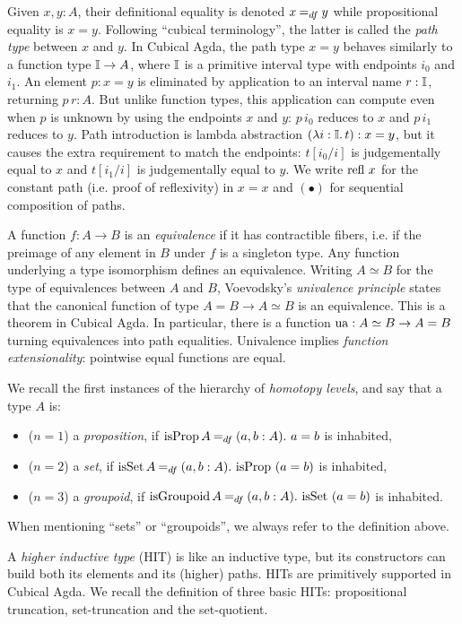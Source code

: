 \documentclass[a4paper,USenglish,cleveref]{lipics-v2021}
\begin{document}
Given $x, y : A$, their definitional equality is denoted $x \DefEq y$ while propositional equality is $x = y$.
Following ``cubical terminology'', the latter is called the \emph{path type} between $x$ and $y$.
In Cubical Agda, the path type $x = y$ behaves similarly to a function type $\mathbb{I} \to A$, where $\mathbb{I}$ is a primitive interval type with endpoints $i_0$ and $i_1$.
An element $p : x = y$ is eliminated by application to an interval name $r : \mathbb{I}$, returning $p \, r : A$.
But unlike function types, this application can compute even when $p$ is unknown by using the endpoints $x$ and $y$: $p \,i_0$ reduces to $x$ and $p \,i_1$ reduces to $y$.
Path introduction is lambda abstraction $(\lambda i : \mathbb{I}.\,t) : x = y$, but it causes the extra requirement to match the endpoints: $t[i_0 / i]$ is judgementally equal to $x$ and $t[i_1 / i]$ is judgementally equal to  $y$. We write $\Refl\,x$ for the constant path (i.e. proof of reflexivity) in $x = x$ and $(\bullet)$ for sequential composition of paths.

A function $f : A \to B$ is an \emph{equivalence} if it has contractible fibers, i.e. if the preimage of any element in $B$ under $f$ is a singleton type. Any function underlying a type isomorphism defines an equivalence. Writing $A \simeq B$ for the type of equivalences between $A$ and $B$, Voevodsky's \emph{univalence principle} states that the canonical function of type $A = B \to A \simeq B$ is an equivalence. This is a theorem in Cubical Agda. In particular, there is a function $\Op{ua} : A \simeq B \to A = B$ turning equivalences into path equalities. Univalence implies \emph{function extensionality}: pointwise equal functions are equal.

We recall the first instances of the hierarchy of \emph{homotopy levels}, and say that a type $A$ is:
\begin{itemize}
  \item[] ($n = 1$) a \emph{proposition}, if
    $\IsProp A \DefEq (a , b : A)\Where a = b$ is inhabited,
  \item[] ($n = 2$) a \emph{set}, if
    $\IsSet A \DefEq (a, b : A)\Where \IsProp \ (a = b)$ is inhabited,
  \item[] ($n = 3$) a \emph{groupoid}, if
    $\IsGpd A \DefEq (a, b : A)\Where \IsSet \ (a = b)$ is inhabited.
\end{itemize}
When mentioning \enquote{sets} or \enquote{groupoids}, we always refer to the definition above.

A \emph{higher inductive type} (HIT) is like an inductive type, but its constructors can build both its elements and its (higher) paths. HITs are primitively supported in Cubical Agda. We recall the definition of three basic HITs: propositional truncation, set-truncation and the set-quotient. 
\end{document}
